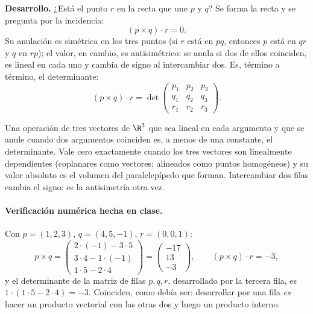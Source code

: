 {\small\vspace{1mm}\par}


\textbf{Desarrollo.} ¿Está el punto \(r\) en la recta que une \(p\) y \(q\)? Se forma la
recta y se pregunta por la incidencia:
\[
  (p\times q)\cdot r=0 .
\]
Su anulación es simétrica en los tres puntos (si \(r\) está en \(pq\), entonces \(p\) está
en \(qr\) y \(q\) en \(rp\)); el valor, en cambio, es antisimétrico: se anula si dos de
ellos coinciden, es lineal en cada uno y cambia de signo al intercambiar dos. Es, término a término, el determinante:
\[
  (p\times q)\cdot r=\det\begin{pmatrix}p_1&p_2&p_3\\q_1&q_2&q_3\\r_1&r_2&r_3\end{pmatrix}.
\]

\begin{resultado}
Una operación de tres vectores de \(\R^3\) que sea lineal en cada argumento y que se anule
cuando dos argumentos coinciden es, a menos de una constante, el determinante. Vale cero
exactamente cuando los tres vectores son linealmente dependientes (coplanares como vectores;
alineados como puntos homogéneos) y su valor absoluto es el volumen del paralelepípedo que
forman. Intercambiar dos filas cambia el signo: es la antisimetría otra vez.
\end{resultado}

\paragraph{Verificación numérica hecha en clase.} Con \(p=(1,2,3)\), \(q=(4,5,-1)\),
\(r=(0,0,1)\):
\[
  p\times q=\begin{pmatrix}2\cdot(-1)-3\cdot5\\ 3\cdot4-1\cdot(-1)\\ 1\cdot5-2\cdot4\end{pmatrix}
  =\begin{pmatrix}-17\\13\\-3\end{pmatrix},\qquad
  (p\times q)\cdot r=-3,
\]
y el determinante de la matriz de filas \(p,q,r\), desarrollado por la tercera fila, es
\(1\cdot(1\cdot5-2\cdot4)=-3\). Coinciden, como debía ser: desarrollar por una fila
\emph{es} hacer un producto vectorial con las otras dos y luego un producto interno.

